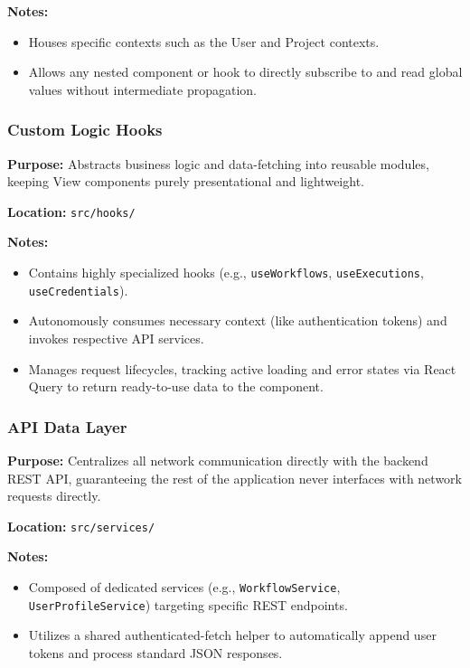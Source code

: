 \vspace{0.2cm}
\noindent\textbf{Notes:}
\begin{itemize}
    \item Houses specific contexts such as the User and Project contexts.
    \item Allows any nested component or hook to directly subscribe to and read global values without intermediate propagation.
\end{itemize}

\subsubsection{Custom Logic Hooks}

\textbf{Purpose:} Abstracts business logic and data-fetching into reusable modules, keeping View components purely presentational and lightweight.

\vspace{0.2cm}
\noindent\textbf{Location:} \texttt{src/hooks/}

\vspace{0.2cm}
\noindent\textbf{Notes:}
\begin{itemize}
    \item Contains highly specialized hooks (e.g., \texttt{useWorkflows}, \texttt{useExecutions}, \texttt{useCredentials}).
    \item Autonomously consumes necessary context (like authentication tokens) and invokes respective API services.
    \item Manages request lifecycles, tracking active loading and error states via React Query to return ready-to-use data to the component.
\end{itemize}

\subsubsection{API Data Layer}

\textbf{Purpose:} Centralizes all network communication directly with the backend REST API, guaranteeing the rest of the application never interfaces with network requests directly.

\vspace{0.2cm}
\noindent\textbf{Location:} \texttt{src/services/}

\vspace{0.2cm}
\noindent\textbf{Notes:}
\begin{itemize}
    \item Composed of dedicated services (e.g., \texttt{WorkflowService}, \texttt{UserProfileService}) targeting specific REST endpoints.
    \item Utilizes a shared authenticated-fetch helper to automatically append user tokens and process standard JSON responses.
\end{itemize}

